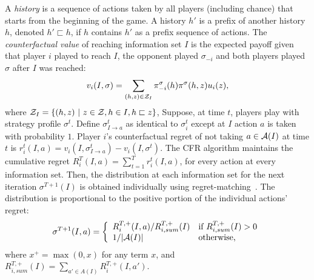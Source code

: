A {\it history} is a sequence of actions taken by all players (including chance) that starts from the beginning of the game.
A history $h'$ is a prefix of another history $h$, denoted $h' \sqsubset h$, if $h$ contains $h'$ as a prefix sequence of actions.
The {\it counterfactual value} of reaching information set $I$ is the expected payoff given that player $i$ played to reach $I$, the opponent played
$\sigma_{-i}$ and both players played $\sigma$ after $I$ was reached:
\begin{equation}
\label{eq:cfv}
v_i(I,\sigma) = \sum_{(h,z) \in \mathcal{Z}_I} \pi^{\sigma}_{-i}(h) \pi^{\sigma}(h,z) u_i(z),
\end{equation}
where $\mathcal{Z}_I = \{ (h,z)~|~z \in \mathcal{Z}, h \in I, h \sqsubset z \}$, 
Suppose, at time $t$, players play with strategy profile $\sigma^t$.
Define $\sigma^t_{I \rightarrow a}$ as identical to $\sigma^t_i$ except at $I$ action $a$ is taken with probability $1$.
Player $i$'s counterfactual regret of not taking $a \in \mathcal{A}(I)$ at time $t$ is $r_i^t(I,a) = v_i(I, \sigma^t_{I \rightarrow a}) - v_i(I,\sigma^t)$.
The CFR algorithm maintains the cumulative regret $R_i^T(I,a) = \sum_{t=1}^T r_i^t(I,a)$, for every action at every information set.
Then, the distribution at each information set for the next iteration $\sigma^{T+1}(I)$ is obtained individually using
regret-matching~\cite{Hart00}. The distribution is proportional to the positive portion of the individual actions' regret:
\begin{equation*}
\label{eq:rm}
\sigma^{T+1}(I,a) = \left\{
\begin{array}{ll}
R_i^{T,+}(I,a) / R^{T,+}_{i,sum}(I) & \mbox{if } R^{T,+}_{i,sum}(I) > 0 \\
1 / |\mathcal{A}(I)|                   & \mbox{otherwise,}
\end{array} \right.
\end{equation*}
where $x^+ = \max(0,x)$ for any term $x$, and $R^{T,+}_{i,sum}(I) = \sum_{a' \in A(I)} R_i^{T,+}(I,a')$.
